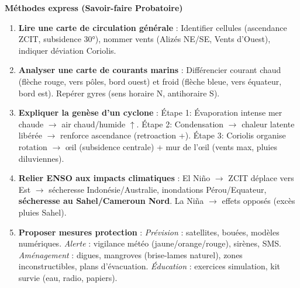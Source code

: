 \documentclass[11pt]{article}
\begin{document}
\begin{aretenir}
\textbf{Méthodes express (Savoir-faire Probatoire)}
\begin{enumerate}
    \item \textbf{Lire une carte de circulation générale} : Identifier cellules (ascendance ZCIT, subsidence 30°), nommer vents (Alizés NE/SE, Vents d'Ouest), indiquer déviation Coriolis.
    \item \textbf{Analyser une carte de courants marins} : Différencier courant chaud (flèche rouge, vers pôles, bord ouest) et froid (flèche bleue, vers équateur, bord est). Repérer gyres (sens horaire N, antihoraire S).
    \item \textbf{Expliquer la genèse d'un cyclone} : Étape 1: Évaporation intense mer chaude $\rightarrow$ air chaud/humide $\uparrow$. Étape 2: Condensation $\rightarrow$ chaleur latente libérée $\rightarrow$ renforce ascendance (retroaction +). Étape 3: Coriolis organise rotation $\rightarrow$ œil (subsidence centrale) + mur de l'œil (vents max, pluies diluviennes).
    \item \textbf{Relier ENSO aux impacts climatiques} : El Niño $\rightarrow$ ZCIT déplace vers Est $\rightarrow$ sécheresse Indonésie/Australie, inondations Pérou/Equateur, \textbf{sécheresse au Sahel/Cameroun Nord}. La Niña $\rightarrow$ effets opposés (excès pluies Sahel).
    \item \textbf{Proposer mesures protection} : \textit{Prévision} : satellites, bouées, modèles numériques. \textit{Alerte} : vigilance météo (jaune/orange/rouge), sirènes, SMS. \textit{Aménagement} : digues, mangroves (brise-lames naturel), zones inconstructibles, plans d'évacuation. \textit{Éducation} : exercices simulation, kit survie (eau, radio, papiers).
\end{enumerate}

\end{aretenir}
\end{document}

